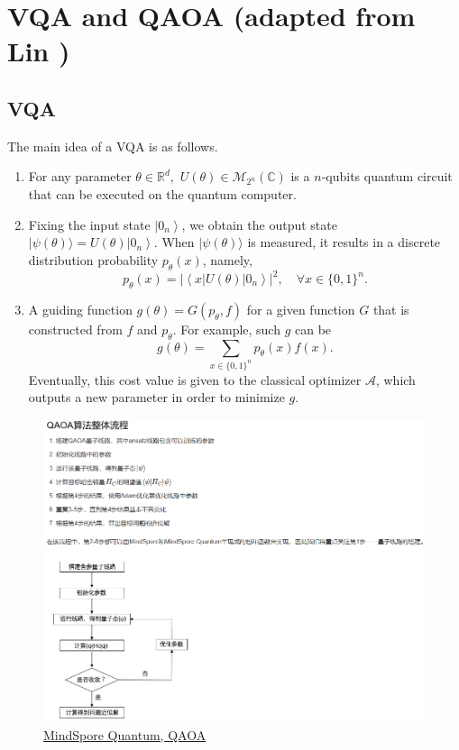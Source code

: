 \documentclass[
        11pt, %
	a4paper, %
]{LegrandOrangeBook}
\begin{document}
\section{VQA and QAOA (adapted from Lin \cite{grange2023introduction})}

\subsection{VQA}

The main idea of a VQA is as follows.

\begin{enumerate}
    \item For any parameter $\theta \in \mathbb{R}^d,$ $U(\theta) \in \mathcal{M}_{2^n}(\mathbb{C})$ is a $n$-qubits quantum circuit that can be executed on the quantum computer.
    \item Fixing the input state $\left|0_n\right\rangle$, we obtain the output state $|\psi (\theta) \rangle = U(\theta)\left|0_n\right\rangle$. When $|\psi (\theta) \rangle$ is measured, it results in a discrete distribution probability $p_\theta(x)$, namely,
\begin{equation}
    p_\theta(x)=\left|\left\langle x|U(\theta)| 0_n\right\rangle\right|^2, \quad \forall x \in \{0,1\}^{n}.
\end{equation}
    \item A guiding function $g(\theta)=G\left(p_{\theta}, f\right)$ for a given function $G$ that is constructed from $f$ and $p_{\theta}$. For example, such $g$ can be    
\begin{equation}
    g(\theta)=\sum_{x \in\{0,1\}^n} p_\theta(x) f(x).
\end{equation}
    Eventually, this cost value is given to the classical optimizer $\mathcal{A}$, which outputs a new parameter in order to minimize $g$.
\end{enumerate}

\begin{figure}
    \centering
    \includegraphics[width=1\linewidth]{Images/mindspore-qaoa.png}
    \caption{\href{https://www.mindspore.cn/mindquantum/docs/zh-CN/r0.9/case_library/quantum_approximate_optimization_algorithm.html}{MindSpore Quantum, QAOA } }
\end{figure}
\end{document}
